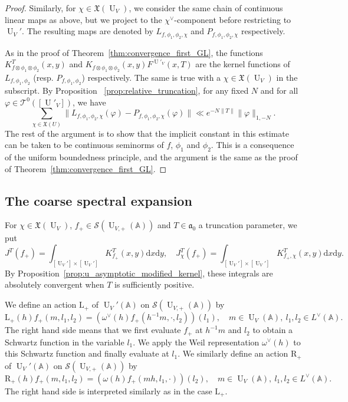 \documentclass[letterpaper,11pt]{amsart}
\newcommand{\fa}{\mathfrak{a}}
\newcommand{\fX}{\mathfrak{X}}
\newcommand{\bA}{\mathbb{A}}
\newcommand{\cS}{\mathcal{S}}
\newcommand{\cT}{\mathcal{T}}
\newcommand{\rd}{\mathrm{d}}
\newcommand{\<}{\negthickspace}
\DeclareMathOperator{\U}{U}
\theoremstyle{definition}
\theoremstyle{plain}
\theoremstyle{remark}
\numberwithin{equation}{section}
\begin{document}
\begin{proof}
Similarly, for $\chi \in \fX(\U_V)$, we consider the same chain of continuous
linear maps as above, but we project to the $\chi^\vee$-component before
restricting to $\U_V'$. The resulting maps are denoted by
$L_{f,\phi_1,\phi_2,\chi}$ and $P_{f,\phi_1,\phi_2,\chi}$ respectively.

As in the proof of Theorem~\ref{thm:convergence_first_GL}, the functions
$K^T_{f \otimes \phi_1 \otimes \phi_2}(x,y)$ and $K_{f \otimes \phi_1 \otimes
\phi_2}(x,y) F^{\U'_V}(x,T)$ are the kernel functions of $L_{f,\phi_1,\phi_2}$
(resp. $P_{f,\phi_1,\phi_2}$) respectively. The same is true with a
$\chi \in \fX(\U_V)$ in the subscript. By Proposition
~\ref{prop:relative_truncation}, for any fixed $N$ and for all $\varphi \in
\cT^0([\U'_V])$, we have
    \[
    \sum_{\chi \in \fX(U)}
    \| L_{f,\phi_1,\phi_2,\chi}(\varphi)
    - P_{f,\phi_1,\phi_2,\chi}(\varphi) \|
    \ll e^{-N\|T\|} \| \varphi \|_{1,-N}.
    \]
The rest of the argument is to show that the implicit constant in this
estimate can be taken to be continuous seminorms of $f$, $\phi_1$ and
$\phi_2$. This is a consequence of the uniform boundedness principle, and the
argument is the same as the proof of Theorem~\ref{thm:convergence_first_GL}.
\end{proof}


\subsection{The coarse spectral expansion}  \label{subsec:coarse_spectral_U}
For $\chi \in \fX(\U_V)$, $f_+ \in \cS(\U_{V,+}(\bA))$ and $T \in
\fa_0$ a truncation parameter, we put
    \[
    J^T(f_+) = \int_{[\U_V'] \times [\U_V']}
    K_{f_+}^T(x,y) \rd x \rd y, \quad
    J^T_\chi(f_+) = \int_{[\U_V'] \times [\U_V']}
    K_{f_+,\chi}^T(x,y) \rd x \rd y.
    \]
By Proposition~\ref{prop:u_asymptotic_modified_kernel}, these integrals are
absolutely convergent when $T$ is sufficiently positive.


We define an action $\mathrm{L}_+$ of $\U_V'(\bA)$ on $\cS(\U_{V,
+}(\bA))$ by
    \[
    \mathrm{L}_+(h)f_+ (m, l_1, l_2) =
    \left(\omega^\vee(h) f_+(h^{-1}m, \cdot, l_2)\right)(l_1), \quad
    m \in \U_V(\bA), \ l_1, l_2 \in L^\vee(\bA).
    \]
The right hand side means that we first evaluate $f_+$ at $h^{-1}m$ and $l_2$
to obtain a Schwartz function in the variable $l_1$. We apply the Weil
representation $\omega^\vee(h)$ to this Schwartz function and finally
evaluate at $l_1$. We similarly define an action $\mathrm{R}_+$ of
$\U_V'(\bA)$ on $\cS(\U_{V, +}(\bA))$ by
    \[
    \mathrm{R}_+(h)f_+ (m, l_1, l_2) =
    \left(\omega(h) f_+(m h, l_1, \cdot)\right)(l_2), \quad
    m \in \U_V(\bA), \ l_1, l_2 \in L^\vee(\bA).
    \]
The right hand side is interpreted similarly as in the case $\mathrm{L}_+$.
\end{document}

